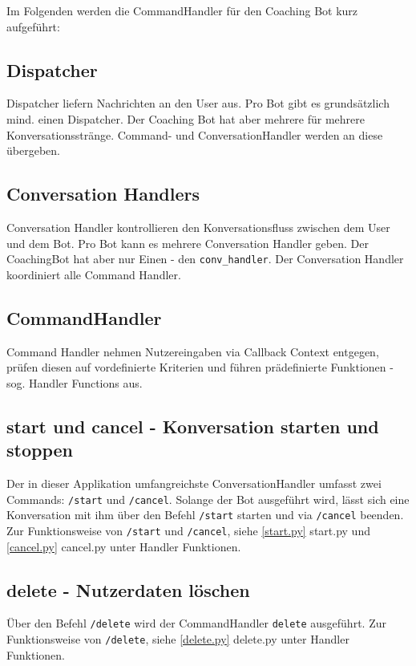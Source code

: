         Im Folgenden werden die CommandHandler für den Coaching Bot kurz aufgeführt:
        
        \subsection{Dispatcher}
            Dispatcher liefern Nachrichten an den User aus. Pro Bot gibt es grundsätzlich mind. einen Dispatcher. Der Coaching Bot hat aber mehrere für mehrere Konversationsstränge. Command- und ConversationHandler werden an diese übergeben.


        \subsection{Conversation Handlers}
            Conversation Handler kontrollieren den Konversationsfluss zwischen dem User und dem Bot. Pro Bot kann es mehrere Conversation Handler geben. Der CoachingBot hat aber nur Einen - den \verb|conv_handler|. Der Conversation Handler koordiniert alle Command Handler.


        \subsection{CommandHandler}
            Command Handler nehmen Nutzereingaben via Callback Context entgegen, prüfen diesen auf vordefinierte Kriterien und führen prädefinierte Funktionen - sog. Handler Functions aus.


        \subsection{start und cancel - Konversation starten und stoppen}
            Der in dieser Applikation umfangreichste ConversationHandler umfasst zwei Commands: \verb|/start| und \verb|/cancel|. Solange der Bot ausgeführt wird, lässt sich eine Konversation mit ihm über den Befehl \verb|/start| starten und via \verb|/cancel| beenden. Zur Funktionsweise von \verb|/start| und \verb|/cancel|, siehe \ref{start.py} start.py und \ref{cancel.py} cancel.py unter Handler Funktionen. 


        \subsection{delete - Nutzerdaten löschen}
            Über den Befehl \verb|/delete| wird der CommandHandler \verb|delete| ausgeführt. Zur Funktionsweise von \verb|/delete|, siehe \ref{delete.py} delete.py unter Handler Funktionen. 


